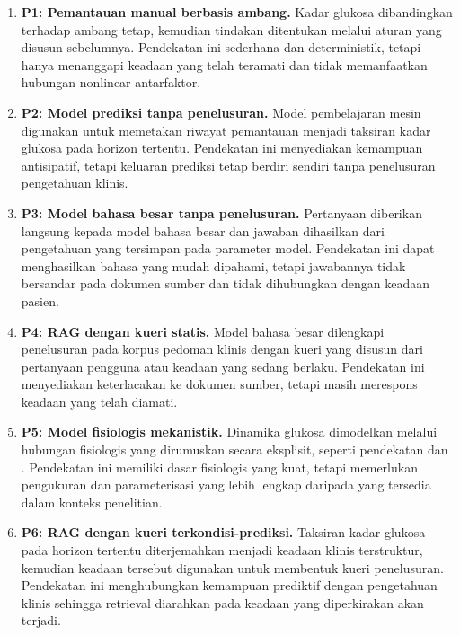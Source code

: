 \begin{enumerate}
    \item \textbf{P1: Pemantauan manual berbasis ambang.} Kadar glukosa dibandingkan terhadap ambang tetap, kemudian tindakan ditentukan melalui aturan yang disusun sebelumnya.
    Pendekatan ini sederhana dan deterministik, tetapi hanya menanggapi keadaan yang telah teramati dan tidak memanfaatkan hubungan nonlinear antarfaktor.

    \item \textbf{P2: Model prediksi tanpa penelusuran.} Model pembelajaran mesin digunakan untuk memetakan riwayat pemantauan menjadi taksiran kadar glukosa pada horizon tertentu.
    Pendekatan ini menyediakan kemampuan antisipatif, tetapi keluaran prediksi tetap berdiri sendiri tanpa penelusuran pengetahuan klinis.

    \item \textbf{P3: Model bahasa besar tanpa penelusuran.} Pertanyaan diberikan langsung kepada model bahasa besar dan jawaban dihasilkan dari pengetahuan yang tersimpan pada parameter
    model. Pendekatan ini dapat menghasilkan bahasa yang mudah dipahami, tetapi jawabannya tidak bersandar pada dokumen sumber dan tidak dihubungkan dengan keadaan pasien.

    \item \textbf{P4: RAG dengan kueri statis.} Model bahasa besar dilengkapi penelusuran pada korpus pedoman klinis dengan kueri yang disusun dari pertanyaan pengguna atau keadaan yang
    sedang berlaku. Pendekatan ini menyediakan keterlacakan ke dokumen sumber, tetapi masih merespons keadaan yang telah diamati.

    \item \textbf{P5: Model fisiologis mekanistik.} Dinamika glukosa dimodelkan melalui hubungan fisiologis yang dirumuskan secara eksplisit, seperti pendekatan \textcite{bergman1979} dan
    \textcite{dallaman2014}. Pendekatan ini memiliki dasar fisiologis yang kuat, tetapi memerlukan pengukuran dan parameterisasi yang lebih lengkap daripada yang tersedia dalam konteks penelitian.

    \item \textbf{P6: RAG dengan kueri terkondisi-prediksi.} Taksiran kadar glukosa pada horizon tertentu diterjemahkan menjadi keadaan klinis terstruktur, kemudian keadaan tersebut
    digunakan untuk membentuk kueri penelusuran. Pendekatan ini menghubungkan kemampuan prediktif dengan pengetahuan klinis sehingga retrieval diarahkan pada keadaan yang diperkirakan 
    akan terjadi.
\end{enumerate}

